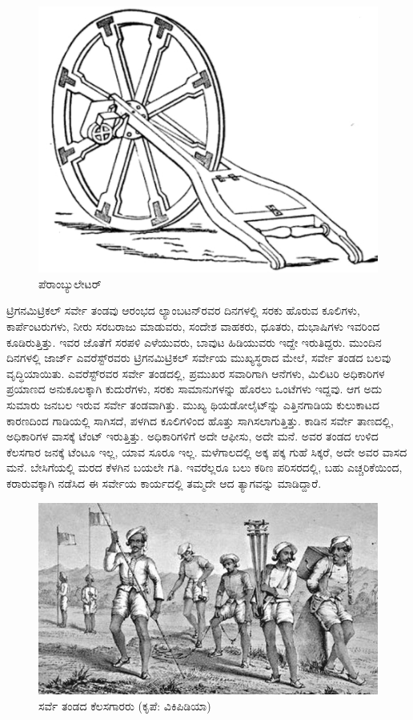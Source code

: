\begin{figure}[!htbp]
\includegraphics{"images/image008.jpg"}
\caption{ಪೆರಾಂಬ್ಯುಲೇಟರ್​}\label{chap5-fig2}
\end{figure}

ಟ್ರಿಗನಮಿಟ್ರಿಕಲ್​ ಸರ್ವೇ ತಂಡವು ಆರಂಭದ ಲ್ಯಾಂಬಟನ್​ರವರ ದಿನಗಳಲ್ಲಿ ಸರಕು ಹೊರುವ ಕೂಲಿಗಳು, ಕಾರ್ಪೆಂಟರುಗಳು, ನೀರು ಸರಬರಾಜು ಮಾಡುವರು, ಸಂದೇಶ ವಾಹಕರು, ಧೂತರು, ದುಭಾಷಿಗಳು ಇವರಿಂದ ಕೂಡಿರುತ್ತಿತ್ತು. ಇವರ ಜೊತೆಗೆ ಸರಪಳಿ ಎಳೆಯುವರು, ಬಾವುಟ ಹಿಡಿಯುವರು ಇದ್ದೇ ಇರುತಿದ್ದರು. ಮುಂದಿನ ದಿನಗಳಲ್ಲಿ ಜಾರ್ಜ್ ಎವರೆಸ್ಟ್​ರವರು ಟ್ರಿಗನಮಿಟ್ರಿಕಲ್​ ಸರ್ವೇಯ ಮುಖ್ಯಸ್ಥರಾದ ಮೇಲೆ, ಸರ್ವೇ ತಂಡದ ಬಲವು ವೃದ್ಧಿಯಾಯಿತು. ಎವರೆಸ್ಟ್​ರವರ ಸರ್ವೇ ತಂಡದಲ್ಲಿ, ಪ್ರಮುಖರ ಸವಾರಿಗಾಗಿ  ಆನೆಗಳು, ಮಿಲಿಟರಿ ಅಧಿಕಾರಿಗಳ ಪ್ರಯಾಣದ ಅನುಕೂಲಕ್ಕಾಗಿ  ಕುದುರೆಗಳು, ಸರಕು ಸಾಮಾನುಗಳನ್ನು ಹೊರಲು  ಒಂಟೆಗಳು ಇದ್ದವು. ಆಗ ಅದು ಸುಮಾರು  ಜನಬಲ ಇರುವ ಸರ್ವೇ ತಂಡವಾಗಿತ್ತು. ಮುಖ್ಯ ಥಿಯಡೋಲೈಟ್​ನ್ನು ಎತ್ತಿನಗಾಡಿಯ ಕುಲುಕಾಟದ ಕಾರಣದಿಂದ ಗಾಡಿಯಲ್ಲಿ ಸಾಗಿಸದೆ, ಪಳಗಿದ ಕೂಲಿಗಳಿಂದ ಹೊತ್ತು ಸಾಗಿಸಲಾಗುತ್ತಿತ್ತು. ಕಾಡಿನ ಸರ್ವೇ ತಾಣದಲ್ಲಿ, ಅಧಿಕಾರಿಗಳ ವಾಸಕ್ಕೆ ಟೆಂಟ್​ ಇರುತ್ತಿತ್ತು. ಅಧಿಕಾರಿಗಳಿಗೆ ಅದೇ ಆಫೀಸು, ಅದೇ ಮನೆ. ಅವರ ತಂಡದ ಉಳಿದ ಕೆಲಸಗಾರ ಜನಕ್ಕೆ ಟೆಂಟೂ ಇಲ್ಲ, ಯಾವ ಸೂರೂ ಇಲ್ಲ. ಮಳೆಗಾಲದಲ್ಲಿ ಅಕ್ಕ ಪಕ್ಕ ಗುಹೆ ಸಿಕ್ಕರೆ, ಅದೇ ಅವರ ವಾಸದ ಮನೆ. ಬೇಸಿಗೆಯಲ್ಲಿ ಮರದ ಕೆಳಗಿನ ಬಯಲೇ ಗತಿ. ಇವರೆಲ್ಲರೂ ಬಲು ಕಠಿಣ ಪರಿಸರದಲ್ಲಿ, ಬಹು ಎಚ್ಚರಿಕೆಯಿಂದ, ಕರಾರುವಕ್ಕಾಗಿ ನಡೆಸಿದ ಈ ಸರ್ವೇಯ ಕಾರ್ಯದಲ್ಲಿ ತಮ್ಮದೇ ಆದ ತ್ಯಾಗವನ್ನು ಮಾಡಿದ್ದಾರೆ.

\begin{figure}[!htbp]
\includegraphics{"images/image009.jpg"}
\caption{ಸರ್ವೆ ತಂಡದ ಕೆಲಸಗಾರರು (ಕೃಪೆ: ವಿಕಿಪಿಡಿಯಾ)}\label{chap5-fig3}
\end{figure}

